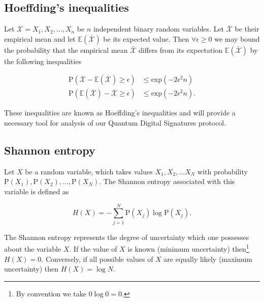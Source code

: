 \FloatBarrier
\subsection{Hoeffding's inequalities}
Let $\mathcal{X} = X_1, X_2, \dots, X_n$ be $n$ independent binary random variables. Let $\bar{\mathcal{X}}$ be their empirical mean  and let $\mathbb{E}\left(\bar{\mathcal{X}}\right)$ be its expected value. Then $\forall \epsilon \ge 0$ we may bound the probability that the empirical mean $\bar{\mathcal{X}}$ differs from its expectation $\mathbb{E}\left(\bar{\mathcal{X}}\right)$ by the following inequalities

\begin{align}
\label{eqn:hoeffding1}
\text{P}\left(\bar{\mathcal{X}} - \mathbb{E}\left(\bar{\mathcal{X}}\right) \ge \epsilon\right) &\le \text{exp}\left(- 2 \epsilon^2 n\right) \\
\label{eqn:hoeffding2}
\text{P}\left(\mathbb{E}\left(\bar{\mathcal{X}}\right) - \bar{\mathcal{X}} \ge \epsilon\right) &\le \text{exp}\left(- 2 \epsilon^2 n\right).
\end{align}





\noindent These inequalities are known as Hoeffding's inequalities \cite{Hoeffding1963} and will provide a necessary tool for analysis of our Quantum Digital Signatures protocol.



\FloatBarrier
\subsection{Shannon entropy}\label{sec:intro_shannon_entropy}
Let $X$ be a random variable, which takes values $X_1, X_2, \dots X_N$ with probability $\text{P}\left(X_1\right), \text{P}\left(X_2\right),\dots,\text{P}\left(X_N\right)$. The Shannon entropy associated with this variable is defined as 

\begin{equation}
H\left(X\right) = - \sum_{j=1}^N \text{P}\left(X_j\right) \log \text{P}\left(X_j\right).
\end{equation}

\noindent The Shannon entropy represents the degree of uncertainty which one possesses about the variable $X$. If the value of $X$ is known (minimum uncertainty) then\footnote{By convention we take $0 \log 0 = 0$.} $H\left(X\right) = 0$. Conversely, if all possible values of $X$ are equally likely (maximum uncertainty) then $H\left(X\right) = \log N$.

